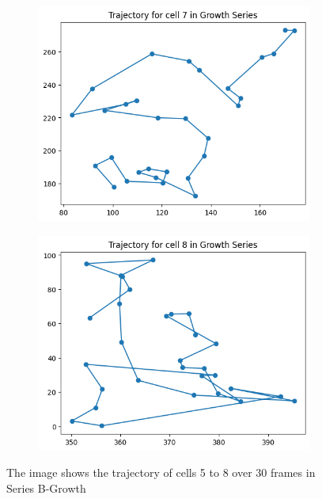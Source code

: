 \documentclass{article}
\begin{document}
\begin{figure}[h!]
\begin{subfigure}[b]{0.5\linewidth}
        \centering
        \includegraphics[width=\linewidth]{Report/Appendix_Images/Trajectory-B-Growth/trajectory_7.png}
    \end{subfigure}%
    \begin{subfigure}[b]{0.5\linewidth}
        \centering
        \includegraphics[width=\linewidth]{Report/Appendix_Images/Trajectory-B-Growth/trajectory_8.png}
    \end{subfigure}
    \caption{The image shows the trajectory of cells 5 to 8 over 30 frames in Series B-Growth}
    \label{fig:Trajectory-GrowthSeries-5-8}
\end{figure}
\end{document}
